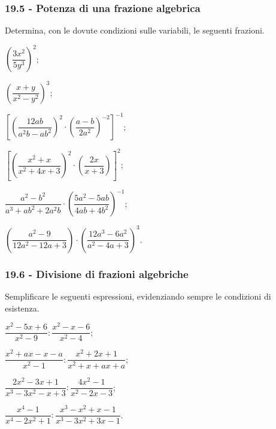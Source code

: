 \subsubsection*{19.5 - Potenza di una frazione algebrica}

\begin{esercizio}
\label{ese:19.18}
Determina, con le dovute condizioni sulle variabili, le seguenti frazioni.
\begin{multicols}{2}
\begin{enumeratea}
 \item $\left(\dfrac{3x^{2}}{5y^{3}}\right)^{2}$;
 \item $\left(\dfrac{x+y}{x^{2}-y^{2}}\right)^{3}$;
 \item $\left[\left(\dfrac{12ab}{a^{2}b-ab^{2}}\right)^{2}\cdot \left(\dfrac{a-b}{2a^{2}}\right)^{-2}\right]^{-1}$;
 \item $\left[\left(\dfrac{x^{2}+x}{x^{2}+4x+3}\right)^{2}\cdot \left(\dfrac{2x}{x+3}\right)\right]^{2}$;
 \item $\dfrac{a^{2}-b^{2}}{a^{3}+ab^{2}+2a^{2}b}\cdot\left(\dfrac{5a^{2}-5ab}{4ab+4b^{2}}\right)^{-1}$;
 \item $\left(\dfrac{a^{2}-9}{12a^{2}-12a+3}\right)\cdot \left(\dfrac{12a^{3}-6a^{2}}{a^{2}-4a+3}\right)^{3}$.
\end{enumeratea}
\end{multicols}
\end{esercizio}

\subsubsection*{19.6 - Divisione di frazioni algebriche}

\begin{esercizio}[\Ast]
\label{ese:19.19}
Semplificare le seguenti espressioni, evidenziando sempre le condizioni di esistenza.
\begin{multicols}{2}
\begin{enumeratea}
 \item $\dfrac{x^{2}-5x+6}{x^{2}-9}:\dfrac{x^{2}-x-6}{x^{2}-4}$;
 \item $\dfrac{x^{2}+ax-x-a}{x^{2}-1}:\dfrac{x^{2}+2x+1}{x^{2}+x+ax+a}$;
 \item $\dfrac{2x^{2}-3x+1}{x^{3}-3x^{2}-x+3}:\dfrac{4x^{2}-1}{x^{2}-2x-3}$;
 \item $\dfrac{x^{4}-1}{x^{4}-2x^{2}+1}:\dfrac{x^{3}-x^{2}+x-1}{x^{3}-3x^{2}+3x-1}$.
\end{enumeratea}
\end{multicols}
\end{esercizio}


